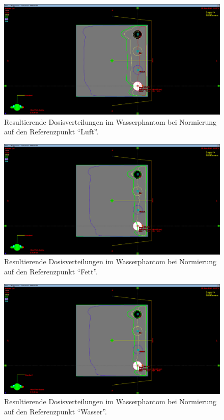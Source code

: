 \begin{figure}[H]
  \centering
  \includegraphics[width=\textwidth]{../../Wasserphantom Bilder/Aufgabe3.1_ReferenzLuft.png}
  \caption{Resultierende Dosisverteilungen im Wasserphantom bei Normierung auf den Referenzpunkt \enquote{Luft}.}
  \label{abb:3.1Luft}
\end{figure}

\begin{figure}[H]
  \centering
  \includegraphics[width=\textwidth]{../../Wasserphantom Bilder/Aufgabe3.1_ReferenzFett.png}
  \caption{Resultierende Dosisverteilungen im Wasserphantom bei Normierung auf den Referenzpunkt \enquote{Fett}.}
  \label{abb:3.1Fett}
\end{figure}

\begin{figure}[H]
  \centering
  \includegraphics[width=\textwidth]{../../Wasserphantom Bilder/Aufgabe3.1_ReferenzWasser.png}
  \caption{Resultierende Dosisverteilungen im Wasserphantom bei Normierung auf den Referenzpunkt \enquote{Wasser}.}
  \label{abb:3.1Wasser}
\end{figure}

